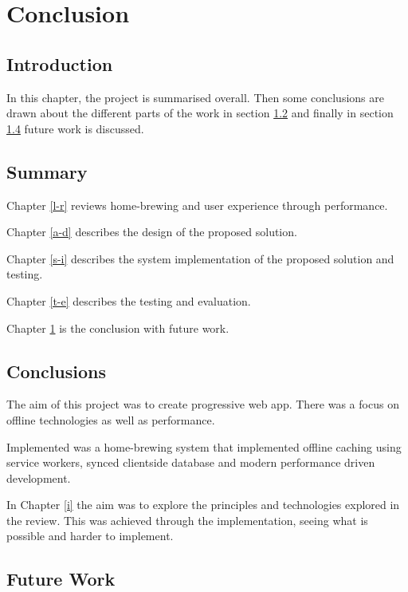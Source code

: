 \chapter{Conclusion} \label{c}

\section{Introduction} \label{c--introduction}

In this chapter, the project is summarised overall. Then some conclusions are drawn about the different parts of the work in section \ref{c--summary} and finally in section \ref{c--future-work} future work is discussed.

\section{Summary} \label{c--summary}

Chapter \ref{l-r} reviews home-brewing and user experience through performance.

Chapter \ref{a-d} describes the design of the proposed solution.

Chapter \ref{s-i} describes the system implementation of the proposed solution and testing.

Chapter \ref{t-e} describes the testing and evaluation.

Chapter \ref{c} is the conclusion with future work.

\section{Conclusions} \label{c--conclusions}

The aim of this project was to create progressive web app. There was a focus on offline technologies as well as performance.

Implemented was a home-brewing system that implemented offline caching using service workers, synced clientside database and modern performance driven development.

In Chapter \ref{i} the aim was to explore the principles and technologies explored in the review. This was achieved through the implementation, seeing what is possible and harder to implement.

\section{Future Work} \label{c--future-work}


